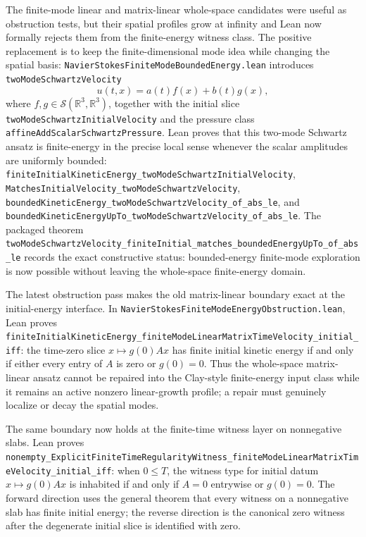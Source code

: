 \documentclass[11pt]{article}
\begin{document}
The finite-mode linear and matrix-linear whole-space candidates were useful as
obstruction tests, but their spatial profiles grow at infinity and Lean now
formally rejects them from the finite-energy witness class.  The positive
replacement is to keep the finite-dimensional mode idea while changing the
spatial basis: \texttt{NavierStokesFiniteModeBoundedEnergy.lean} introduces
\texttt{twoModeSchwartzVelocity}
\[
  u(t,x)=a(t) f(x)+b(t) g(x),
\]
where \(f,g\in\mathcal{S}(\mathbb{R}^3,\mathbb{R}^3)\), together with the
initial slice \texttt{twoModeSchwartzInitialVelocity} and the pressure class
\texttt{affineAddScalarSchwartzPressure}.  Lean proves that this two-mode
Schwartz ansatz is finite-energy in the precise local sense whenever the scalar
amplitudes are uniformly bounded:
\texttt{finiteInitialKineticEnergy\_twoModeSchwartzInitialVelocity},
\texttt{MatchesInitialVelocity\_twoModeSchwartzVelocity},
\texttt{boundedKineticEnergy\_twoModeSchwartzVelocity\_of\_abs\_le}, and
\texttt{boundedKineticEnergyUpTo\_twoModeSchwartzVelocity\_of\_abs\_le}.
The packaged theorem
\texttt{twoModeSchwartzVelocity\_finiteInitial\_matches\_boundedEnergyUpTo\_of\_abs\_le}
records the exact constructive status: bounded-energy finite-mode exploration
is now possible without leaving the whole-space finite-energy domain.

The latest obstruction pass makes the old matrix-linear boundary exact at the
initial-energy interface.  In
\texttt{NavierStokesFiniteModeEnergyObstruction.lean}, Lean proves
\texttt{finiteInitialKineticEnergy\_finiteModeLinearMatrixTimeVelocity\_initial\_iff}:
the time-zero slice \(x\mapsto g(0)Ax\) has finite initial kinetic energy if
and only if either every entry of \(A\) is zero or \(g(0)=0\).  Thus the
whole-space matrix-linear ansatz cannot be repaired into the Clay-style
finite-energy input class while it remains an active nonzero linear-growth
profile; a repair must genuinely localize or decay the spatial modes.

The same boundary now holds at the finite-time witness layer on nonnegative
slabs.  Lean proves
\texttt{nonempty\_ExplicitFiniteTimeRegularityWitness\_finiteModeLinearMatrixTimeVelocity\_initial\_iff}:
when \(0\le T\), the witness type for initial datum \(x\mapsto g(0)Ax\) is
inhabited if and only if \(A=0\) entrywise or \(g(0)=0\).  The forward
direction uses the general theorem that every witness on a nonnegative slab has
finite initial energy; the reverse direction is the canonical zero witness
after the degenerate initial slice is identified with zero.
\end{document}
